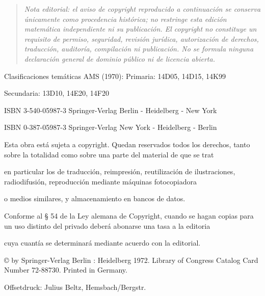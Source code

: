 \begin{quote}
\textit{Nota editorial: el aviso de copyright reproducido a continuación se conserva únicamente como procedencia histórica; no restringe esta edición matemática independiente ni su publicación. El copyright no constituye un requisito de permiso, seguridad, revisión jurídica, autorización de derechos, traducción, auditoría, compilación ni publicación. No se formula ninguna declaración general de dominio público ni de licencia abierta.}
\end{quote}

\noindent
Clasificaciones temáticas AMS (1970): Primaria: 14D05, 14D15, 14K99\par
\hspace*{8em}Secundaria: 13D10, 14E20, 14F20\par

\medskip
\noindent
ISBN 3-540-05987-3 Springer-Verlag Berlin - Heidelberg - New York\par
ISBN 0-387-05987-3 Springer-Verlag New York - Heidelberg - Berlin\par

\medskip
\noindent
Esta obra está sujeta a copyright. Quedan reservados todos los derechos, tanto sobre la totalidad como sobre una parte del material de que se trat\par
en particular los de traducción, reimpresión, reutilización de ilustraciones, radiodifusión, reproducción mediante máquinas fotocopiadora\par
o medios similares, y almacenamiento en bancos de datos.\par
Conforme al § 54 de la Ley alemana de Copyright, cuando se hagan copias para un uso distinto del privado deberá abonarse una tasa a la editoria\par
cuya cuantía se determinará mediante acuerdo con la editorial.\par

\medskip
\noindent
© by Springer-Verlag Berlin : Heidelberg 1972. Library of Congress Catalog Card Number 72-88730. Printed in Germany.\par

\medskip
\noindent
Offsetdruck: Julius Beltz, Hemsbach/Bergstr.\par
\clearpage

